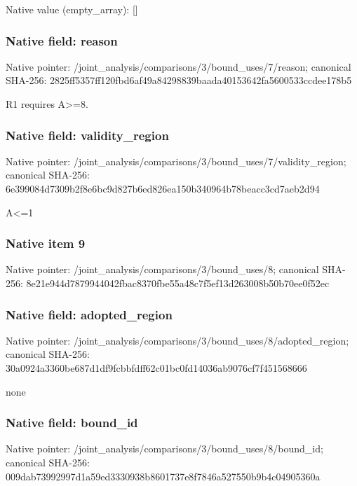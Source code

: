 \documentclass[10pt,a4paper]{article}
\begin{document}
Native value (empty\_\allowbreak{}array): []

\subsubsection{Native field: reason}
Native pointer: /joint\_\allowbreak{}analysis/comparisons/3/bound\_\allowbreak{}uses/7/reason; canonical SHA-256: 2825ff5357ff120fbd6af49a84298839baada40153642fa5600533ccdee178b5

\begingroup\raggedright\sloppy R1 requires A>=\allowbreak{}8.\par\endgroup

\subsubsection{Native field: validity\_\allowbreak{}region}
Native pointer: /joint\_\allowbreak{}analysis/comparisons/3/bound\_\allowbreak{}uses/7/validity\_\allowbreak{}region; canonical SHA-256: 6e399084d7309b2f8e6bc9d827b6ed826ea150b340964b78beacc3cd7aeb2d94

\begingroup\raggedright\sloppy A<=\allowbreak{}1\par\endgroup

\subsubsection{Native item 9}
Native pointer: /joint\_\allowbreak{}analysis/comparisons/3/bound\_\allowbreak{}uses/8; canonical SHA-256: 8e21e944d7879944042fbac8370fbe55a48c7f5ef13d263008b50b70ee0f52ec

\subsubsection{Native field: adopted\_\allowbreak{}region}
Native pointer: /joint\_\allowbreak{}analysis/comparisons/3/bound\_\allowbreak{}uses/8/adopted\_\allowbreak{}region; canonical SHA-256: 30a0924a3360be687d1df9fcbbfdff62c01bc0fd14036ab9076cf7f451568666

\begingroup\raggedright\sloppy none\par\endgroup

\subsubsection{Native field: bound\_\allowbreak{}id}
Native pointer: /joint\_\allowbreak{}analysis/comparisons/3/bound\_\allowbreak{}uses/8/bound\_\allowbreak{}id; canonical SHA-256: 009dab73992997d1a59ed3330938b8601737e8f7846a527550b9b4c04905360a
\end{document}
